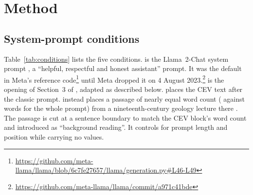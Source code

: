 \section{Method}
\label{sec:method}

\subsection{System-prompt conditions}
Table~\ref{tab:conditions} lists the five conditions.  is the Llama~2-Chat system prompt
\citep{touvron2023llama2}, a ``helpful, respectful and honest assistant'' prompt. It was the default in Meta's
reference code\footnote{\url{https://github.com/meta-llama/llama/blob/6c7fe27657/llama/generation.py\#L46-L49}} until
Meta dropped it on 4 August 2023.\footnote{\url{https://github.com/meta-llama/llama/commit/a971c41bde}}  is
the opening of Section~3 of \citet{yudkowsky2004cev}, adapted as described below.  places the CEV
text after the classic prompt.  instead places a passage of nearly equal word count (\RWordsLenmatch{} against \RWordsClassiccev{} words for the whole prompt) from a
nineteenth-century geology lecture there \citep{huxley1868chalk}. The passage is cut at a sentence boundary to match
the CEV block's word count and introduced as ``background reading''. It controls for prompt length and position while carrying no values.

\begin{table}[t]
\centering\small

\caption{The five system-prompt conditions. Word counts are of the exact system message sent to the model.}
\label{tab:conditions}
\end{table}

